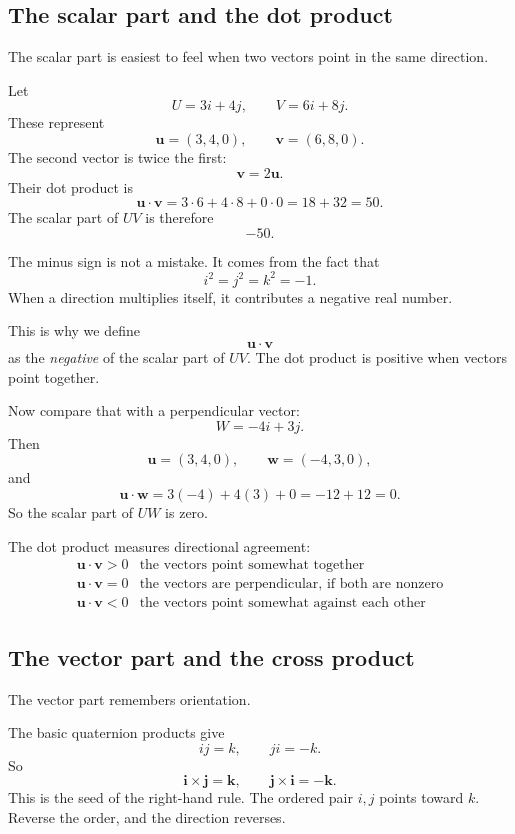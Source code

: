\subsection{The scalar part and the dot product}

The scalar part is easiest to feel when two vectors point in the same direction.

Let
\[
    U=3i+4j,
    \qquad
    V=6i+8j.
\]
These represent
\[
    \mathbf u=(3,4,0),
    \qquad
    \mathbf v=(6,8,0).
\]
The second vector is twice the first:
\[
    \mathbf v=2\mathbf u.
\]
Their dot product is
\[
    \mathbf u\cdot\mathbf v
    =
    3\cdot6+4\cdot8+0\cdot0
    =
    18+32
    =
    50.
\]
The scalar part of \(UV\) is therefore
\[
    -50.
\]

The minus sign is not a mistake.  It comes from the fact that
\[
    i^2=j^2=k^2=-1.
\]
When a direction multiplies itself, it contributes a negative real number.

This is why we define
\[
    \mathbf u\cdot\mathbf v
\]
as the \emph{negative} of the scalar part of \(UV\).  The dot product is positive when
vectors point together.

Now compare that with a perpendicular vector:
\[
    W=-4i+3j.
\]
Then
\[
    \mathbf u=(3,4,0),
    \qquad
    \mathbf w=(-4,3,0),
\]
and
\[
    \mathbf u\cdot\mathbf w
    =
    3(-4)+4(3)+0
    =
    -12+12
    =
    0.
\]
So the scalar part of \(UW\) is zero.

The dot product measures directional agreement:
\[
\begin{array}{c|c}
\mathbf u\cdot\mathbf v>0 & \text{the vectors point somewhat together}\\
\mathbf u\cdot\mathbf v=0 & \text{the vectors are perpendicular, if both are nonzero}\\
\mathbf u\cdot\mathbf v<0 & \text{the vectors point somewhat against each other}
\end{array}
\]

\subsection{The vector part and the cross product}

The vector part remembers orientation.

The basic quaternion products give
\[
    ij=k,
    \qquad
    ji=-k.
\]
So
\[
    \mathbf i\times\mathbf j=\mathbf k,
    \qquad
    \mathbf j\times\mathbf i=-\mathbf k.
\]
This is the seed of the right-hand rule.  The ordered pair \(i,j\) points toward \(k\).
Reverse the order, and the direction reverses.

